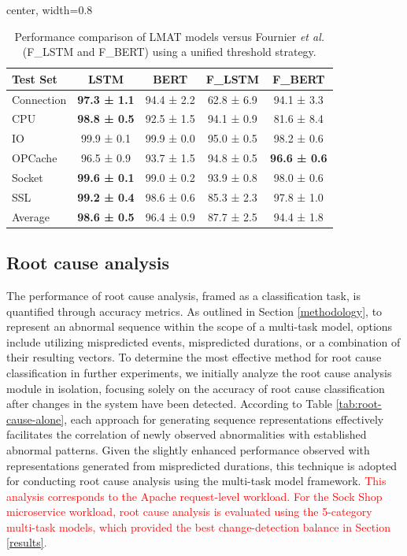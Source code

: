 \documentclass[preprint,12pt]{elsarticle}
\begin{document}
\begin{table}[tb]
\centering
\caption{Performance comparison of LMAT models versus Fournier \textit{et al.} \cite{fournier2023language} (F\_LSTM and F\_BERT) using a unified threshold strategy.}
\label{tab:quentin_results}
\begin{adjustbox}{center, width=0.8\textwidth}
\begin{tabular}{|l|c|c|c|c|}
\hline
Test Set & LSTM & BERT & F\_LSTM & F\_BERT \\ \hline
Connection & \textbf{97.3 ± 1.1}       & 94.4 ± 2.2 & 62.8 ± 6.9 & 94.1 ± 3.3 \\
CPU        & \textbf{98.8 ± 0.5}       & 92.5 ± 1.5 & 94.1 ± 0.9 & 81.6 ± 8.4 \\
IO         & 99.9 ± 0.1 & 99.9 ± 0.0   & 95.0 ± 0.5 & 98.2 ± 0.6 \\
OPCache    & 96.5 ± 0.9 & 93.7 ± 1.5   & 94.8 ± 0.5 & \textbf{96.6 ± 0.6} \\
Socket     & \textbf{99.6 ± 0.1}       & 99.0 ± 0.2 & 93.9 ± 0.8 & 98.0 ± 0.6 \\
SSL        & \textbf{99.2 ± 0.4}       & 98.6 ± 0.6 & 85.3 ± 2.3 & 97.8 ± 1.0 \\ \hline
Average        & \textbf{98.6 ± 0.5}        & 96.4 ± 0.9 & 87.7 ± 2.5 & 94.4 ± 1.8 \\ \hline
\end{tabular}
\end{adjustbox}
\end{table}


\subsection{Root cause analysis}
The performance of root cause analysis, framed as a classification task, is quantified through accuracy metrics. As outlined in Section \ref{methodology}, to represent an abnormal sequence within the scope of a multi-task model, options include utilizing mispredicted events, mispredicted durations, or a combination of their resulting vectors. To determine the most effective method for root cause classification in further experiments, we initially analyze the root cause analysis module in isolation, focusing solely on the accuracy of root cause classification after changes in the system have been detected. According to Table \ref{tab:root-cause-alone}, each approach for generating sequence representations effectively facilitates the correlation of newly observed abnormalities with established abnormal patterns. Given the slightly enhanced performance observed with representations generated from mispredicted durations, this technique is adopted for conducting root cause analysis using the multi-task model framework. \textcolor{red}{This analysis corresponds to the Apache request-level workload. For the Sock Shop microservice workload, root cause analysis is evaluated using the 5-category multi-task models, which provided the best change-detection balance in Section \ref{results}.}
\end{document}
